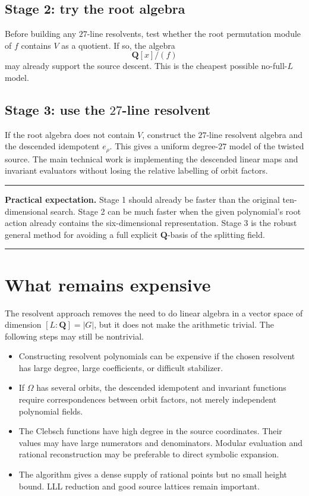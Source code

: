 \documentclass[11pt]{article}
\newcommand{\QQ}{\mathbf{Q}}
\newenvironment{summarybox}{%
  \begin{center}\begin{minipage}{0.94\textwidth}\small
  \hrule\vspace{0.55em}%
}{%
  \vspace{0.55em}\hrule\end{minipage}\end{center}%
}
\begin{document}
\subsection{Stage 2: try the root algebra}

Before building any $27$-line resolvents, test whether the root permutation module
of $f$ contains $V$ as a quotient.  If so, the algebra
\[
  \QQ[x]/(f)
\]
may already support the source descent.  This is the cheapest possible no-full-$L$
model.

\subsection{Stage 3: use the $27$-line resolvent}

If the root algebra does not contain $V$, construct the $27$-line resolvent algebra
and the descended idempotent $e_\rho$.  This gives a uniform degree-$27$ model of
the twisted source.  The main technical work is implementing the descended linear
maps and invariant evaluators without losing the relative labelling of orbit
factors.

\begin{summarybox}
\textbf{Practical expectation.}
Stage 1 should already be faster than the original ten-dimensional search.  Stage 2
can be much faster when the given polynomial's root action already contains the
six-dimensional representation.  Stage 3 is the robust general method for avoiding
a full explicit $\QQ$-basis of the splitting field.
\end{summarybox}

\section{What remains expensive}

The resolvent approach removes the need to do linear algebra in a vector space of
dimension $[L:\QQ]=|G|$, but it does not make the arithmetic trivial.  The following
steps may still be nontrivial.

\begin{itemize}
\item Constructing resolvent polynomials can be expensive if the chosen resolvent
has large degree, large coefficients, or difficult stabilizer.

\item If $\Omega$ has several orbits, the descended idempotent and invariant
functions require correspondences between orbit factors, not merely independent
polynomial fields.

\item The Clebsch functions have high degree in the source coordinates.  Their
values may have large numerators and denominators.  Modular evaluation and rational
reconstruction may be preferable to direct symbolic expansion.

\item The algorithm gives a dense supply of rational points but no small height
bound.  LLL reduction and good source lattices remain important.
\end{itemize}
\end{document}
